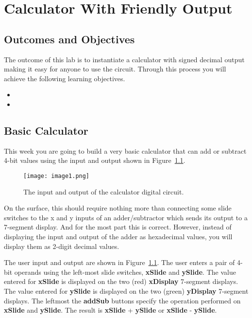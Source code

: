 \chapter{Calculator With Friendly Output}
\label{chapter:calc}
\graphicspath{{./Lab06Calculator/Fig}}

\section{Outcomes and Objectives}

The outcome of this lab is to instantiate a calculator with signed
decimal output making it easy for anyone to use the circuit.
Through this process you will achieve the following
learning objectives.
\begin{itemize}
	\item {}
	\item {}
\end{itemize}



\section{Basic Calculator}

This week you are going to build a very basic calculator that can add or
subtract 4-bit values using the input and output shown in 
Figure~\ref{fig:calcDevBoard}.

\begin{figure}[ht]
\texttt{[image:  image1.png]}
\caption{The input and output of the calculator digital circuit.}
\label{fig:calcDevBoard}
\end{figure}

On the surface, this should require nothing more
than connecting some slide switches to the x and y inputs of an
adder/subtractor which sends its output to a 7-segment display. And for
the most part this is correct. However, instead of displaying the input
and output of the adder as hexadecimal values, you will display them as
2-digit decimal values. 

The user input and output are shown in Figure~\ref{fig:calcDevBoard}.
The user enters a pair of 4-bit operands using the left-most slide
switches, \textbf{xSlide} and \textbf{ySlide}. The value entered for
\textbf{xSlide} is displayed on the two (red) \textbf{xDisplay}
7-segment displays. The value entered for \textbf{ySlide} is displayed
on the two (green) \textbf{yDisplay} 7-segment displays. The leftmost
the \textbf{addSub} buttons specify the operation performed on
\textbf{xSlide} and \textbf{ySlide}. The result is \textbf{xSlide} +
\textbf{ySlide} or \textbf{xSlide} - \textbf{ySlide}. 



